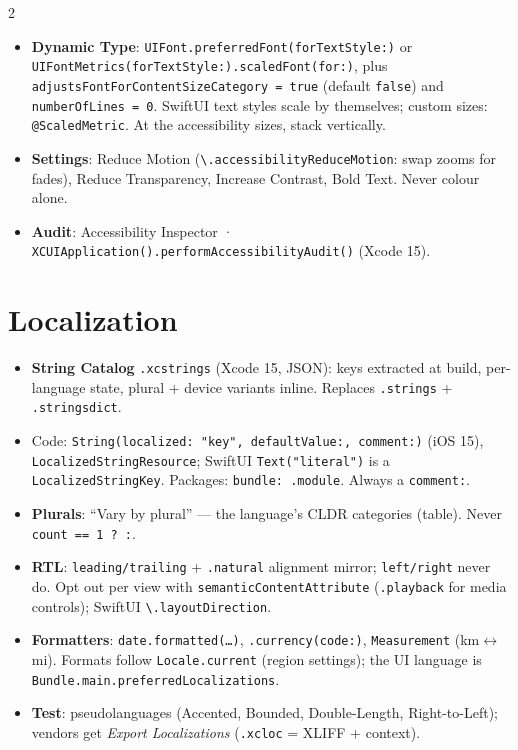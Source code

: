\documentclass[8pt]{extarticle}
\begin{document}
\begin{multicols}{2}
\begin{itemize}
        not localized, never spoken.
  \item \textbf{Dynamic Type}: \texttt{UIFont.preferredFont(forTextStyle:)}
        or \texttt{UIFontMetrics(forTextStyle:)}\allowbreak\texttt{.scaledFont(for:)},
        plus \texttt{adjustsFontForContentSizeCategory = true} (default
        \texttt{false}) and \texttt{numberOfLines = 0}. SwiftUI text styles
        scale by themselves; custom sizes: \texttt{@ScaledMetric}. At the
        accessibility sizes, stack vertically.
  \item \textbf{Settings}: Reduce Motion
        (\texttt{\textbackslash.accessibilityReduceMotion}: swap zooms for
        fades), Reduce Transparency, Increase Contrast, Bold Text. Never
        colour alone.
  \item \textbf{Audit}: Accessibility Inspector ·
        \texttt{XCUIApplication().performAccessibilityAudit()} (Xcode 15).
\end{itemize}

\section{Localization}
\begin{itemize}
  \item \textbf{String Catalog} \texttt{.xcstrings} (Xcode 15, JSON): keys
        extracted at build, per-language state, plural + device variants
        inline. Replaces \texttt{.strings} + \texttt{.stringsdict}.
  \item Code: \texttt{String(localized: "key", defaultValue:, comment:)}
        (iOS 15), \texttt{LocalizedStringResource}; SwiftUI
        \texttt{Text("literal")} is a \texttt{LocalizedStringKey}.
        Packages: \texttt{bundle: .module}. Always a \texttt{comment:}.
  \item \textbf{Plurals}: ``Vary by plural'' — the language's CLDR
        categories (table). Never \texttt{count == 1 ? :}.
  \item \textbf{RTL}: \texttt{leading/trailing} + \texttt{.natural}
        alignment mirror; \texttt{left/right} never do. Opt out per view with
        \texttt{semanticContentAttribute} (\texttt{.playback} for media
        controls); SwiftUI \texttt{\textbackslash.layoutDirection}.
  \item \textbf{Formatters}: \texttt{date.formatted(\ldots)},
        \texttt{.currency(code:)}, \texttt{Measurement} (km$\leftrightarrow$mi).
        Formats follow \texttt{Locale.current} (region settings); the UI
        language is \texttt{Bundle.main.preferredLocalizations}.
  \item \textbf{Test}: pseudolanguages (Accented, Bounded, Double-Length,
        Right-to-Left); vendors get \emph{Export Localizations}
        (\texttt{.xcloc} = XLIFF + context).
\end{itemize}


\end{multicols}
\end{document}
